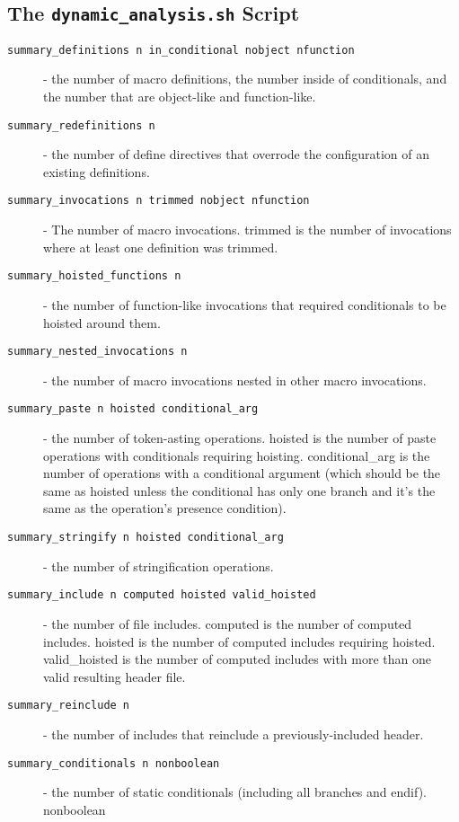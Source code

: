 \documentclass{article}
\begin{document}
\subsection{The \texttt{dynamic\_analysis.sh} Script}

\begin{description}
\item[\texttt{summary\_definitions n in\_conditional nobject
    nfunction}] - the number of macro definitions, the number inside
  of conditionals, and the number that are object-like and
  function-like.
\item[\texttt{summary\_redefinitions n}] - the number of define directives that overrode the configuration of an existing definitions.
\item[\texttt{summary\_invocations n trimmed nobject nfunction}] - The
  number of macro invocations.  trimmed is the number of invocations
  where at least one definition was trimmed.
\item[\texttt{summary\_hoisted\_functions n}] - the number of
  function-like invocations that required conditionals to be hoisted
  around them.
\item[\texttt{summary\_nested\_invocations n}] - the number of macro
  invocations nested in other macro invocations.
\item[\texttt{summary\_paste n hoisted conditional\_arg}] - the number
  of token-asting operations.  hoisted is the number of paste
  operations with conditionals requiring hoisting.  conditional\_arg
  is the number of operations with a conditional argument (which
  should be the same as hoisted unless the conditional has only one
  branch and it's the same as the operation's presence condition).
\item[\texttt{summary\_stringify n hoisted conditional\_arg}] - the
  number of stringification operations.
\item[\texttt{summary\_include n computed hoisted valid\_hoisted}] -
  the number of file includes.  computed is the number of computed
  includes.  hoisted is the number of computed includes requiring
  hoisted.  valid\_hoisted is the number of computed includes with
  more than one valid resulting header file.
\item[\texttt{summary\_reinclude n}] - the number of includes that
  reinclude a previously-included header.
\item[\texttt{summary\_conditionals n nonboolean}] - the number of
  static conditionals (including all branches and endif).  nonboolean

\end{description}
\end{document}
